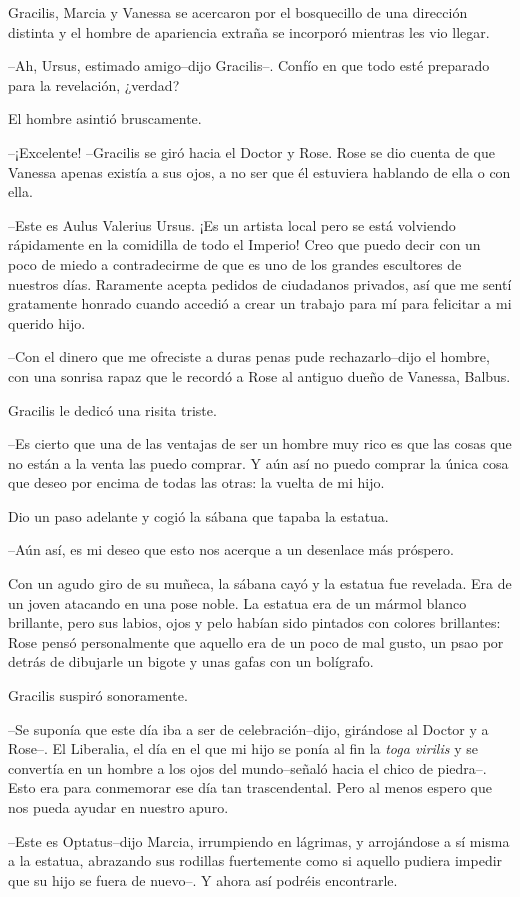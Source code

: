 Gracilis, Marcia y Vanessa se acercaron por el bosquecillo de una
dirección distinta y el hombre de apariencia extraña se incorporó
mientras les vio llegar.

--Ah, Ursus, estimado amigo--dijo Gracilis--. Confío en que todo esté
preparado para la revelación, ¿verdad?

El hombre asintió bruscamente.

--¡Excelente! --Gracilis se giró hacia el Doctor y Rose. Rose se dio
cuenta de que Vanessa apenas existía a sus ojos, a no ser que él
estuviera hablando de ella o con ella.

--Este es Aulus Valerius Ursus. ¡Es un artista local pero se está
volviendo rápidamente en la comidilla de todo el Imperio! Creo que puedo
decir con un poco de miedo a contradecirme de que es uno de los grandes
escultores de nuestros días. Raramente acepta pedidos de ciudadanos
privados, así que me sentí gratamente honrado cuando accedió a crear un
trabajo para mí para felicitar a mi querido hijo.

--Con el dinero que me ofreciste a duras penas pude rechazarlo--dijo el
hombre, con una sonrisa rapaz que le recordó a Rose al antiguo dueño de
Vanessa, Balbus.

Gracilis le dedicó una risita triste.

--Es cierto que una de las ventajas de ser un hombre muy rico es que las
cosas que no están a la venta las puedo comprar. Y aún así no puedo
comprar la única cosa que deseo por encima de todas las otras: la vuelta
de mi hijo.

Dio un paso adelante y cogió la sábana que tapaba la estatua.

--Aún así, es mi deseo que esto nos acerque a un desenlace más próspero.

Con un agudo giro de su muñeca, la sábana cayó y la estatua fue
revelada. Era de un joven atacando en una pose noble. La estatua era de
un mármol blanco brillante, pero sus labios, ojos y pelo habían sido
pintados con colores brillantes: Rose pensó personalmente que aquello
era de un poco de mal gusto, un psao por detrás de dibujarle un bigote y
unas gafas con un bolígrafo.

Gracilis suspiró sonoramente.

--Se suponía que este día iba a ser de celebración--dijo, girándose al
Doctor y a Rose--. El Liberalia, el día en el que mi hijo se ponía al
fin la \emph{toga virilis} y se convertía en un hombre a los ojos del
mundo--señaló hacia el chico de piedra--. Esto era para conmemorar ese
día tan trascendental. Pero al menos espero que nos pueda ayudar en
nuestro apuro.

--Este es Optatus--dijo Marcia, irrumpiendo en lágrimas, y arrojándose a
sí misma a la estatua, abrazando sus rodillas fuertemente como si
aquello pudiera impedir que su hijo se fuera de nuevo--. Y ahora así
podréis encontrarle.